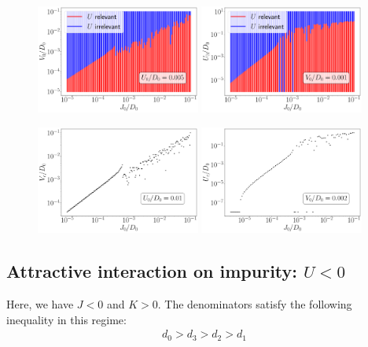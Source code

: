 \begin{figure}[htpb]
	\centering
	\includegraphics[width=0.48\textwidth]{../figures/VvsJ_relvsirr.pdf}
	\hspace*{\fill}
	\includegraphics[width=0.48\textwidth]{../figures/UvsJ_relvsirr.pdf}
\end{figure}

\begin{figure}[htpb]
	\centering
	\includegraphics[width=0.48\textwidth]{../figures/VcvsJ.pdf}
	\hspace*{\fill}
	\includegraphics[width=0.48\textwidth]{../figures/UcvsJ.pdf}
\end{figure}

\subsection{Attractive interaction on impurity: \(U<0\)}
Here, we have \(J<0\) and \(K>0\). The denominators satisfy the following inequality in this regime:
\begin{equation}\begin{aligned}
	d_0 > d_3 > d_2 > d_1
\end{aligned}\end{equation}

